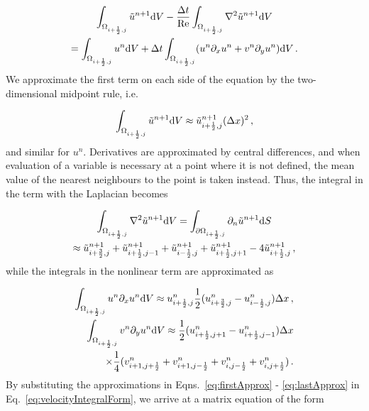 \documentclass[final,3p,twocolumn]{elsarticle}
\begin{document}
\begin{multline}
    \int_{\Omega_{i+\frac{1}{2},j}} \tilde{u}^{n+1} {\rm d}V - \frac{\Delta t}{\rm Re}
    \int_{\Omega_{i+\frac{1}{2},j}} \nabla^2 \tilde{u}^{n+1} {\rm d}V \\
    = \int_{\Omega_{i+\frac{1}{2},j}} u^n {\rm d}V + \Delta t
    \int_{\Omega_{i+\frac{1}{2},j}} (u^n \partial_x u^n + v^n \partial_y u^n)
    {\rm d}V \,.
    \label{eq:velocityIntegralForm}
\end{multline}
%
We approximate the first term on each side of the equation by the
two-dimensional midpoint rule, i.e.\ 

\begin{equation}
    \int_{\Omega_{i+\frac{1}{2},j}} \tilde{u}^{n+1} {\rm d}V \approx
    \tilde{u}_{i+\frac{1}{2},j}^{n+1} (\Delta x)^2 \,, 
    \label{eq:firstApprox}
\end{equation}
%
and similar for $u^n$. Derivatives are approximated by central differences, and
when evaluation of a variable is necessary at a point where it is not defined,
the mean value of the nearest neighbours to the point is taken instead. Thus,
the integral in the term with the Laplacian becomes 

\begin{multline}
    \int_{\Omega_{i+\frac{1}{2},j}} \nabla^2 \tilde{u}^{n+1} {\rm d}V =
    \int_{\partial \Omega_{i+\frac{1}{2},j}} \partial_n \tilde{u}^{n+1} 
    {\rm d}S \\
    \approx \tilde{u}_{i+\frac{3}{2},j}^{n+1} +
    \tilde{u}_{i+\frac{1}{2},j-1}^{n+1} + \tilde{u}_{i-\frac{1}{2},j}^{n+1} +
    \tilde{u}_{i+\frac{1}{2},j+1}^{n+1} - 4\tilde{u}_{i+\frac{1}{2},j}^{n+1} \,, 
\end{multline}
%
while the integrals in the nonlinear term are approximated as 

\begin{align}
    \int_{\Omega_{i+\frac{1}{2},j}} u^n \partial_x u^n {\rm d}V \approx
    u_{i+\frac{1}{2},j}^n \frac{1}{2} (u_{i+\frac{3}{2},j}^n -
    u_{i-\frac{1}{2},j}^n) \Delta x \,, \\
    \nonumber 
    \int_{\Omega_{i+\frac{1}{2},j}} v^n \partial_y u^n {\rm d}V \approx
    \frac{1}{2}(u_{i+\frac{1}{2},j+1}^n-u_{i+\frac{1}{2},j-1}^n) \Delta x \\ 
    \label{eq:lastApprox}
    \times \frac{1}{4} (v_{i+1,j+\frac{1}{2}}^n + v_{i+1,j-\frac{1}{2}}^n +
    v_{i,j-\frac{1}{2}}^n + v_{i,j+\frac{1}{2}}^n) \,.
\end{align}
%
By substituting the approximations in Eqns.\ \eqref{eq:firstApprox} -
\eqref{eq:lastApprox} in Eq.\ \eqref{eq:velocityIntegralForm}, we arrive at a
matrix equation of the form 
\end{document}
